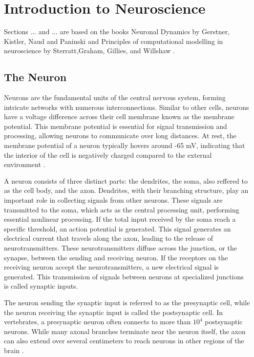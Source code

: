 \documentclass[a4paper, UKenglish, 11pt]{uiomaster}
\begin{document}
\chapter{Introduction to Neuroscience}
Sections ... and ... are based on the books Neuronal Dynamics by Gerstner, Kistler, Naud and Paninski \cite{gerstner2014neuronal} and Principles of computational modelling in neuroscience by Sterratt,Graham, Gillies, and Willshaw \cite{sterratt2011principles}.


\section{The Neuron}

Neurons are the fundamental units of the central nervous system, forming intricate networks with numerous interconnections. Similar to other cells, neurons have a voltage difference across their cell membrane known as the membrane potential. This membrane potential is essential for signal transmission and processing, allowing neurons to communicate over long distances. At rest, the membrane potential of a neuron typically hovers around -65 mV, indicating that the interior of the cell is negatively charged compared to the external environment \cite{sterratt2011principles}.

A neuron consists of three distinct parts: the dendrites, the soma, also reffered to as the cell body, and the axon. Dendrites, with their branching structure, play an important role in collecting signals from other neurons. These signals are transmitted to the soma, which acts as the central processing unit, performing essential nonlinear processing. If the total input received by the soma reach a specific threshold, an action potential is generated. This signal generates an electrical current that travels along the axon, leading to the release of neurotransmitters. These neurotransmitters diffuse across the junction, or the synapse, between the sending and receiving neuron. If the receptors on the receiving neuron accept the neurotransmitters, a new electrical signal is generated. This transmission of signals between neurons at specialized junctions is called synaptic inputs.\cite{gerstner2014neuronal}

The neuron sending the synaptic input is referred to as the presynaptic cell, while the neuron receiving the synaptic input is called the postsynaptic cell. In vertebrates, a presynaptic neuron often connects to more than $10^4$ postsynaptic neurons. While many axonal branches terminate near the neuron itself, the axon can also extend over several centimeters to reach neurons in other regions of the brain \cite{gerstner2014neuronal}.
\end{document}
